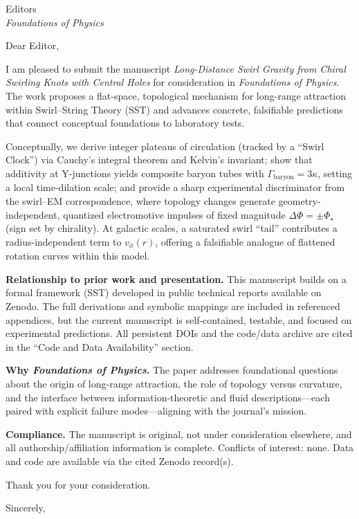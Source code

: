 \documentclass[a4paper,10pt]{letter}
\date{\today}
\begin{document}
\begin{letter}{Editors\\\textit{Foundations of Physics}}
\opening{Dear Editor,}

I am pleased to submit the manuscript \textit{Long-Distance Swirl Gravity from Chiral Swirling Knots with Central Holes} for consideration in \textit{Foundations of Physics}. The work proposes a flat-space, topological mechanism for long-range attraction within Swirl–String Theory (SST) and advances concrete, falsifiable predictions that connect conceptual foundations to laboratory tests.

Conceptually, we derive integer plateaus of circulation (tracked by a “Swirl Clock”) via Cauchy’s integral theorem and Kelvin’s invariant; show that additivity at Y-junctions yields composite baryon tubes with \(\Gamma_{\text{baryon}}=3\kappa\), setting a local time-dilation scale; and provide a sharp experimental discriminator from the swirl–EM correspondence, where topology changes generate geometry-independent, quantized electromotive impulses of fixed magnitude \(\Delta\Phi=\pm\Phi_\star\) (sign set by chirality). At galactic scales, a saturated swirl “tail” contributes a radius-independent term to \(v_\phi(r)\), offering a falsifiable analogue of flattened rotation curves within this model.

\textbf{Relationship to prior work and presentation.} This manuscript builds on a formal framework (SST) developed in public technical reports available on Zenodo. The full derivations and symbolic mappings are included in referenced appendices, but the current manuscript is self-contained, testable, and focused on experimental predictions. All persistent DOIs and the code/data archive are cited in the “Code and Data Availability” section.

\textbf{Why \textit{Foundations of Physics}.} The paper addresses foundational questions about the origin of long-range attraction, the role of topology versus curvature, and the interface between information-theoretic and fluid descriptions—each paired with explicit failure modes—aligning with the journal’s mission.

\textbf{Compliance.} The manuscript is original, not under consideration elsewhere, and all authorship/affiliation information is complete. Conflicts of interest: none. Data and code are available via the cited Zenodo record(s).

Thank you for your consideration.

\closing{Sincerely,}

\end{letter}
\end{document}
